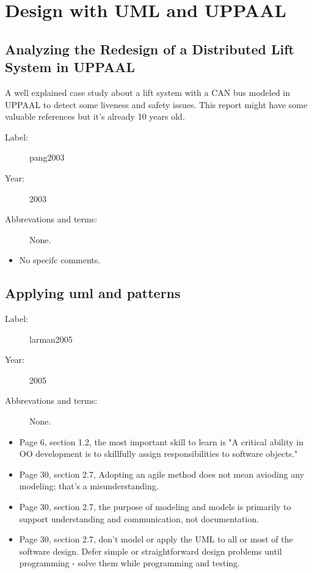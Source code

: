 \chapter{Design with UML and UPPAAL}

\section{Analyzing the Redesign of a Distributed Lift System in UPPAAL}

A well explained case study about a lift system with a CAN bus modeled in
UPPAAL to detect some liveness and safety issues. This report might have some
valuable references but it's already 10 years old.

\begin{description}
    \item[Label:] pang2003 \cite{pang2003}
    \item[Year:] 2003
    \item[Abbrevations and terms:] None.
\end{description}

\begin{itemize}
    \item No specifc comments.
\end{itemize}

\section{Applying uml and patterns}


\begin{description}
    \item[Label:] larman2005 \cite{larman2005}
    \item[Year:] 2005
    \item[Abbrevations and terms:] None.
\end{description}

\begin{itemize}
    \item Page 6, section 1.2, the most important skill to learn is "A critical
        ability in OO development is to skillfully assign responsibilities to
        software objects."
    \item Page 30, section 2.7, Adopting an agile method does not mean avioding
        any modeling; that's a misunderstanding.
    \item Page 30, section 2.7, the purpose of modeling and models is primarily
        to support understanding and communication, not documentation.
    \item Page 30, section 2.7, don't model or apply the UML to all or most of
        the software design. Defer simple or straightforward design problems
        until programming - solve them while programming and testing.
\end{itemize}

